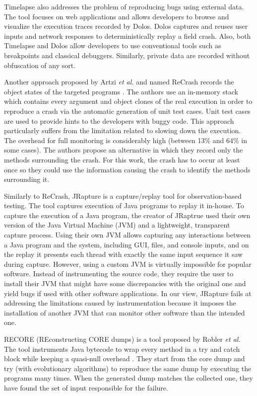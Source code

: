 \documentclass[times]{smrauth}
\begin{document}
Timelapse \cite{Burg2013} also addresses the problem of reproducing bugs using external data. The tool focuses on web applications and allows developers to browse and visualize the execution traces recorded by Dolos. Dolos captures and reuses user inputs and network responses to deterministically replay a field crash. Also, both Timelapse and Dolos allow developers to use conventional tools such as breakpoints and classical debuggers. Similarly, private data are recorded without obfuscation of any sort.

Another approach proposed by Artzi {\it et al.} and named ReCrash records the object states of the targeted programs \cite{Artzi2008}. The authors use an in-memory stack which contains every argument and object clones of the real execution in order to reproduce a crash via the automatic generation of unit test cases. 
Unit test cases are used to provide hints to the developers with buggy code. 
This approach particularly suffers from the limitation related to slowing down the execution. 
The overhead for full monitoring is considerably high (between 13\% and 64\% in some cases). 
The authors  propose an alternative in which they record only the methods surrounding the crash. For this work, the crash has to occur at least once so they could use the information causing the crash to identify the methods surrounding it.

Similarly to ReCrash, JRapture \cite{Steven2000} is a capture/replay tool for observation-based testing. The tool captures execution of Java programs to replay it in-house. To capture the execution of a Java program, the creator of JRaptrue used their own version of the Java Virtual Machine (JVM) and a lightweight, transparent capture process. 
Using their own JVM allows capturing any interactions between a Java program and the system, including GUI, files, and console inputs, and on the replay it presents each thread with exactly the same input sequence it saw during capture. 
However, using a custom JVM is virtually impossible for popular software. 
Instead of instrumenting the source code, they require the user to install their JVM that might have some discrepancies with the original one and yield bugs if used with other software applications. 
In our view,  JRapture fails at addressing the limitations caused by instrumentation because it imposes the installation of another JVM that can monitor other software than the intended one.

RECORE (REconstructing CORE dumps) is a tool proposed by Robler {\it et al.} The tool instruments Java bytecode to wrap every method in a try and catch block while keeping a quasi-null overhead \cite{Rossler2013}. They start from the core dump and try (with evolutionary algorithms) to reproduce the same dump by executing the programs many times. When the generated dump matches the collected one, they have found the set of input responsible for the failure.
\end{document}
